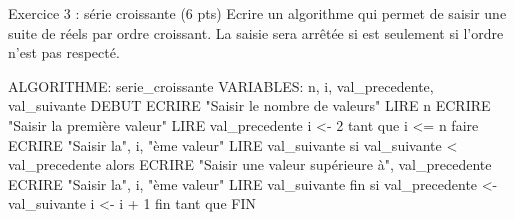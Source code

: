 Exercice 3 : série croissante (6 pts) 
Ecrire un algorithme qui permet de saisir une suite de réels par ordre croissant. La saisie sera arrêtée 
si est seulement si l’ordre n’est pas respecté. 

ALGORITHME: serie_croissante
VARIABLES: n, i, val_precedente, val_suivante
DEBUT
    ECRIRE "Saisir le nombre de valeurs"
    LIRE n
    ECRIRE "Saisir la première valeur"
    LIRE val_precedente
    i <- 2
    tant que i <= n faire
        ECRIRE "Saisir la", i, "ème valeur"
        LIRE val_suivante
        si val_suivante < val_precedente alors
            ECRIRE "Saisir une valeur supérieure à", val_precedente
            ECRIRE "Saisir la", i, "ème valeur"
            LIRE val_suivante
        fin si
        val_precedente <- val_suivante
        i <- i + 1
    fin tant que
FIN

